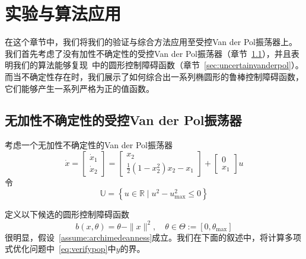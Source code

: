 
\chapter{实验与算法应用}
\label{sec:experiments}

在这个章节中，我们将我们的验证与综合方法应用至受控Van der Pol振荡器上。我们首先考虑了没有加性不确定性的受控Van der Pol振荡器（章节~\ref{sec:cleanvanderpol}），并且表明我们的算法能够复现~\cite{clark22arxiv-cbf}中的圆形控制障碍函数（章节~\ref{sec:uncertainvanderpol}）。而当不确定性存在时，我们展示了如何综合出一系列椭圆形的鲁棒控制障碍函数，它们能够产生一系列严格为正的值函数。

\section{无加性不确定性的受控Van der Pol振荡器}
\label{sec:cleanvanderpol}

考虑一个无加性不确定性的Van der Pol振荡器~\cite{clark22arxiv-cbf}
\begin{equation}\label{eq:cleanvdpodynamics}
    \dot{x} = \left[ \begin{array}{c}
        \dot{x}_1 \\ \dot{x}_2
    \end{array} \right] 
    = \left[ \begin{array}{c}
        x_2 \\
        \frac{1}{2}(1 - x_2^2) x_2 - x_1
    \end{array} \right]
    + \left[ \begin{array}{c}
        0 \\ x_1
    \end{array} \right] u
\end{equation}
令
\begin{equation}\label{eq:cleanvdpou}
    \mathbb{U} = \left\{ u \in \mathbb{R} \mid u^2 - u_{\max}^2 \le 0 \right\}
\end{equation}

定义以下候选的圆形控制障碍函数
\begin{equation}
    \label{eq:cleanvdpocbf}
    b(x, \theta) = \theta - \parallel x \parallel^2, \quad \theta \in \Theta := [0, \theta_{\max}]
\end{equation}
很明显，假设~\ref{assume:archimedeanness}成立。我们在下面的叙述中，将计算多项式优化问题中~\eqref{eq:verifypop}中$y$的界。

